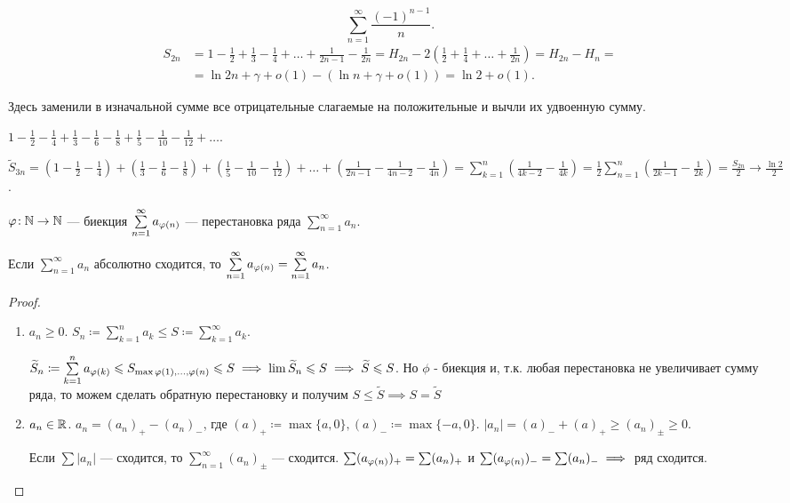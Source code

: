 \begin{example}
    \[
           \sum\limits_{n=1}^\infty \frac{(-1)^{n-1}}{n}
    .\] 
   \begin{align*}
       S_{2n}&=1-\frac{1}{2} + \frac{1}{3} - \frac{1}{4} + \ldots + \frac{1}{2n-1} - \frac{1}{2n} = H_{2n} - 2(\frac{1}{2} + \frac{1}{4} + \ldots + \frac{1}{2n}) = H_{2n} - H_n = \\ 
          &= \ln 2n+ \gamma + o(1) - (\ln n + \gamma + o(1)) = \ln 2 + o(1).
   \end{align*}

    Здесь заменили в изначальной сумме все отрицательные слагаемые на положительные и вычли их удвоенную сумму.
\end{example}
\begin{example}
    $1 - \frac{1}{2} - \frac{1}{4} + \frac{1}{3} - \frac{1}{6} - \frac{1}{8} + \frac{1}{5} - \frac{1}{10} - \frac{1}{12} + \ldots$.

    $\widetilde{S}_{3n} = (1 - \frac{1}{2} - \frac{1}{4}) + (\frac{1}{3} - \frac{1}{6} - \frac{1}{8}) + (\frac{1}{5} - \frac{1}{10} - \frac{1}{12}) + \ldots + (\frac{1}{2n - 1} - \frac{1}{4n-2} - \frac{1}{4n}) = \sum\limits_{k=1}^n(\frac{1}{4k - 2} - \frac{1}{4k}) = \frac{1}{2} \sum\limits_{n=1}^n (\frac{1}{2k-1} - \frac{1}{2k}) = \frac{S_{2n}}{2} \to \frac{\ln 2}{2}$.
\end{example}
\begin{definition}
    $\varphi\!: \mathbb{N} \to \mathbb{N}$ --- биекция $\sum\limits_{n=1}^\infty a_{\varphi(n)}$ --- перестановка ряда $\sum\limits_{n=1}^\infty a_n$.
\end{definition}
\begin{theorem}
    Если $\sum\limits_{n=1}^\infty a_n$ абсолютно сходится, то  $\sum\limits_{n=1}^\infty a_{\varphi(n)} = \sum\limits_{n=1}^\infty a_n$.
\end{theorem}
\begin{proof}
    \begin{enumerate}
        \item $a_n \ge 0$. $S_n \coloneqq \sum\limits_{k=1}^n a_k \le S \coloneqq \sum\limits_{k=1}^\infty a_k$.

            $\widetilde{S}_n \coloneqq \sum\limits_{k=1}^n a_{\varphi(k)} \leqslant S_{\max{\varphi(1), \ldots, \varphi(n)}} \leqslant S \implies \lim \widetilde{S}_n \leqslant S \implies \widetilde{S} \leqslant S$. Но $\phi$ - биекция и, т.к. любая перестановка не увеличивает сумму ряда, то можем сделать обратную перестановку и получим $S \le \widetilde{S} \implies S = \widetilde{S}$
        \item $a_n \in \mathbb{R}$.  $a_n = (a_n)_+ - (a_n)_-$, где $(a)_+ \coloneqq \max\{a, 0\}, (a)_- \coloneqq \max\{-a, 0\}$.  $|a_n| = (a)_- + (a)_+ \ge (a_n)_\pm \ge 0$.

            Если $\sum |a_n|$ --- сходится, то  $\sum\limits_{n=1}^\infty(a_n)_\pm $ --- сходится.  $\sum (a_{\varphi(n)})_+ = \sum (a_n)_+$ и  $\sum (a_{\varphi(n)})_- = \sum (a_n)_- \implies $ ряд сходится.
    \end{enumerate}
\end{proof}

